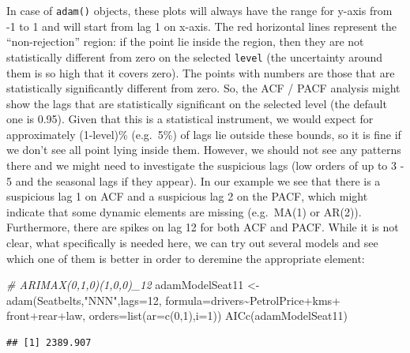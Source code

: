 \documentclass[
]{book}
\newenvironment{Shaded}{\begin{snugshade}}{\end{snugshade}}
\newcommand{\AttributeTok}[1]{\textcolor[rgb]{0.77,0.63,0.00}{#1}}
\newcommand{\CommentTok}[1]{\textcolor[rgb]{0.56,0.35,0.01}{\textit{#1}}}
\newcommand{\DecValTok}[1]{\textcolor[rgb]{0.00,0.00,0.81}{#1}}
\newcommand{\FunctionTok}[1]{\textcolor[rgb]{0.00,0.00,0.00}{#1}}
\newcommand{\NormalTok}[1]{#1}
\newcommand{\OtherTok}[1]{\textcolor[rgb]{0.56,0.35,0.01}{#1}}
\newcommand{\SpecialCharTok}[1]{\textcolor[rgb]{0.00,0.00,0.00}{#1}}
\newcommand{\StringTok}[1]{\textcolor[rgb]{0.31,0.60,0.02}{#1}}
\theoremstyle{definition}
\theoremstyle{definition}
\theoremstyle{definition}
\theoremstyle{definition}
\theoremstyle{remark}
\begin{document}
In case of \texttt{adam()} objects, these plots will always have the range for y-axis from -1 to 1 and will start from lag 1 on x-axis. The red horizontal lines represent the ``non-rejection'' region: if the point lie inside the region, then they are not statistically different from zero on the selected \texttt{level} (the uncertainty around them is so high that it covers zero). The points with numbers are those that are statistically significantly different from zero. So, the ACF / PACF analysis might show the lags that are statistically significant on the selected level (the default one is 0.95). Given that this is a statistical instrument, we would expect for approximately (1-level)\% (e.g.~5\%) of lags lie outside these bounds, so it is fine if we don't see all point lying inside them. However, we should not see any patterns there and we might need to investigate the suspicious lags (low orders of up to 3 - 5 and the seasonal lags if they appear). In our example we see that there is a suspicious lag 1 on ACF and a suspicious lag 2 on the PACF, which might indicate that some dynamic elements are missing (e.g.~MA(1) or AR(2)). Furthermore, there are spikes on lag 12 for both ACF and PACF. While it is not clear, what specifically is needed here, we can try out several models and see which one of them is better in order to deremine the appropriate element:

\begin{Shaded}
\begin{Highlighting}[]
\CommentTok{\# ARIMAX(0,1,0)(1,0,0)\_12}
\NormalTok{adamModelSeat11 }\OtherTok{\textless{}{-}} \FunctionTok{adam}\NormalTok{(Seatbelts,}\StringTok{"NNN"}\NormalTok{,}\AttributeTok{lags=}\DecValTok{12}\NormalTok{,}
                        \AttributeTok{formula=}\NormalTok{drivers}\SpecialCharTok{\textasciitilde{}}\NormalTok{PetrolPrice}\SpecialCharTok{+}\NormalTok{kms}\SpecialCharTok{+}
\NormalTok{                          front}\SpecialCharTok{+}\NormalTok{rear}\SpecialCharTok{+}\NormalTok{law,}
                        \AttributeTok{orders=}\FunctionTok{list}\NormalTok{(}\AttributeTok{ar=}\FunctionTok{c}\NormalTok{(}\DecValTok{0}\NormalTok{,}\DecValTok{1}\NormalTok{),}\AttributeTok{i=}\DecValTok{1}\NormalTok{))}
\FunctionTok{AICc}\NormalTok{(adamModelSeat11)}
\end{Highlighting}
\end{Shaded}

\begin{verbatim}
## [1] 2389.907
\end{verbatim}
\end{document}
